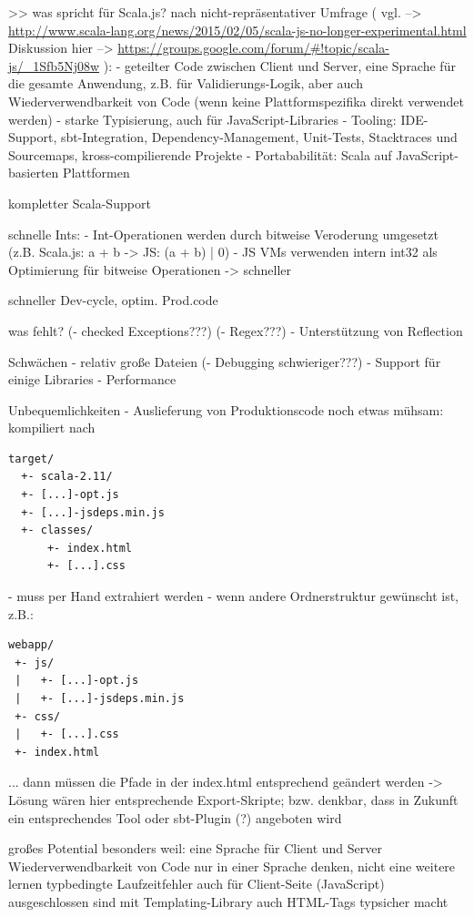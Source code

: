 \documentclass[a4paper, 12pt, hidelinks, listof=totoc, listoftables=totoc, bibliography=totoc]{scrreprt}
\begin{document}
>> was spricht für Scala.js?
    nach nicht-repräsentativer Umfrage (
      vgl.  -->  \url{http://www.scala-lang.org/news/2015/02/05/scala-js-no-longer-experimental.html}
      Diskussion hier  -->  \url{https://groups.google.com/forum/#!topic/scala-js/_1Sfb5Nj08w}
    ):
    - geteilter Code zwischen Client und Server, eine Sprache für die gesamte Anwendung, z.B. für Validierungs-Logik, aber auch Wiederverwendbarkeit von Code (wenn keine Plattformspezifika direkt verwendet werden)
    \cite{doeraene2013.CSJ}
    - starke Typisierung, auch für JavaScript-Libraries
    - Tooling: IDE-Support, sbt-Integration, Dependency-Management, Unit-Tests, Stacktraces und Sourcemaps, kross-compilierende Projekte
    - Portababilität: Scala auf JavaScript-basierten Plattformen

  kompletter Scala-Support
  
  schnelle Ints:
  - Int-Operationen werden durch bitweise Veroderung umgesetzt (z.B. Scala.js: a + b -> JS: (a + b) | 0)
  - JS VMs verwenden intern int32 als Optimierung für bitweise Operationen
  -> schneller\cite{doeraene2015.SSP}


  schneller Dev-cycle, optim. Prod.code
  
  
was fehlt?
  (- checked Exceptions???)
  (- Regex???)
  - Unterstützung von Reflection

Schwächen
  - relativ große Dateien
  (- Debugging schwieriger???)
  - Support für einige Libraries
  - Performance
  
Unbequemlichkeiten
  - Auslieferung von Produktionscode noch etwas mühsam: kompiliert nach
\begin{lstlisting}
target/
  +- scala-2.11/
  +- [...]-opt.js
  +- [...]-jsdeps.min.js
  +- classes/
      +- index.html
      +- [...].css
\end{lstlisting}
  - muss per Hand extrahiert werden
  - wenn andere Ordnerstruktur gewünscht ist, z.B.:
\begin{lstlisting}
webapp/
 +- js/
 |   +- [...]-opt.js
 |   +- [...]-jsdeps.min.js
 +- css/
 |   +- [...].css
 +- index.html
\end{lstlisting}
  ... dann müssen die Pfade in der index.html entsprechend geändert werden
  -> Lösung wären hier entsprechende Export-Skripte; bzw. denkbar, dass in Zukunft ein entsprechendes Tool oder sbt-Plugin (?) angeboten wird



großes Potential
	besonders weil: eine Sprache für Client und Server
		Wiederverwendbarkeit von Code
		nur in einer Sprache denken, nicht eine weitere lernen
	typbedingte Laufzeitfehler auch für Client-Seite (JavaScript) ausgeschlossen sind
	mit Templating-Library auch HTML-Tags typsicher macht
	
\end{document}
